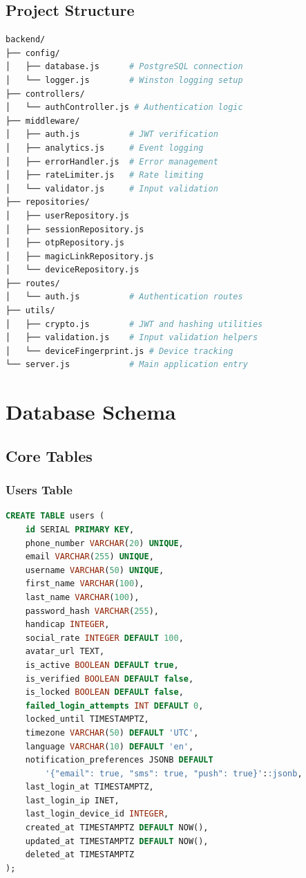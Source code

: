 \documentclass[12pt,a4paper]{article}
\begin{document}
\subsection{Project Structure}
\begin{lstlisting}[language=bash]
backend/
├── config/
│   ├── database.js      # PostgreSQL connection
│   └── logger.js        # Winston logging setup
├── controllers/
│   └── authController.js # Authentication logic
├── middleware/
│   ├── auth.js          # JWT verification
│   ├── analytics.js     # Event logging
│   ├── errorHandler.js  # Error management
│   ├── rateLimiter.js   # Rate limiting
│   └── validator.js     # Input validation
├── repositories/
│   ├── userRepository.js
│   ├── sessionRepository.js
│   ├── otpRepository.js
│   ├── magicLinkRepository.js
│   └── deviceRepository.js
├── routes/
│   └── auth.js          # Authentication routes
├── utils/
│   ├── crypto.js        # JWT and hashing utilities
│   ├── validation.js    # Input validation helpers
│   └── deviceFingerprint.js # Device tracking
└── server.js            # Main application entry
\end{lstlisting}

\section{Database Schema}

\subsection{Core Tables}

\subsubsection{Users Table}
\begin{lstlisting}[language=sql]
CREATE TABLE users (
    id SERIAL PRIMARY KEY,
    phone_number VARCHAR(20) UNIQUE,
    email VARCHAR(255) UNIQUE,
    username VARCHAR(50) UNIQUE,
    first_name VARCHAR(100),
    last_name VARCHAR(100),
    password_hash VARCHAR(255),
    handicap INTEGER,
    social_rate INTEGER DEFAULT 100,
    avatar_url TEXT,
    is_active BOOLEAN DEFAULT true,
    is_verified BOOLEAN DEFAULT false,
    is_locked BOOLEAN DEFAULT false,
    failed_login_attempts INT DEFAULT 0,
    locked_until TIMESTAMPTZ,
    timezone VARCHAR(50) DEFAULT 'UTC',
    language VARCHAR(10) DEFAULT 'en',
    notification_preferences JSONB DEFAULT 
        '{"email": true, "sms": true, "push": true}'::jsonb,
    last_login_at TIMESTAMPTZ,
    last_login_ip INET,
    last_login_device_id INTEGER,
    created_at TIMESTAMPTZ DEFAULT NOW(),
    updated_at TIMESTAMPTZ DEFAULT NOW(),
    deleted_at TIMESTAMPTZ
);
\end{lstlisting}
\end{document}
